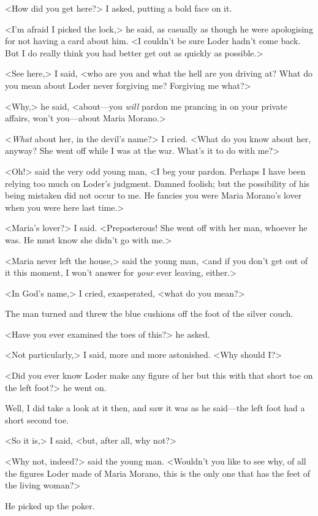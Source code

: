 <How did you get here?> I asked, putting a bold face on it.

<I'm afraid I picked the lock,> he said, as casually as though he were apologising for not having a card about him. <I couldn't be sure Loder hadn't come back. But I do really think you had better get out as quickly as possible.>

<See here,> I said, <who are you and what the hell are you driving at? What do you mean about Loder never forgiving me? Forgiving me what?>

<Why,> he said, <about—you \emph{will} pardon me prancing in on your private affairs, won't you—about Maria Morano.>

<\emph{What} about her, in the devil's name?> I cried. <What do you know about her, anyway? She went off while I was at the war. What's it to do with me?>

<Oh!> said the very odd young man, <I beg your pardon. Perhaps I have been relying too much on Loder's judgment. Damned foolish; but the possibility of his being mistaken did not occur to me. He fancies you were Maria Morano's lover when you were here last time.>

<Maria's lover?> I said. <Preposterous! She went off with her man, whoever he was. He must know she didn't go with me.>

<Maria never left the house,> said the young man, <and if you don't get out of it this moment, I won't answer for \emph{your} ever leaving, either.>

<In God's name,> I cried, exasperated, <what do you mean?>

The man turned and threw the blue cushions off the foot of the silver couch.

<Have you ever examined the toes of this?> he asked.

<Not particularly,> I said, more and more astonished. <Why should I\@?>

<Did you ever know Loder make any figure of her but this with that short toe on the left foot?> he went on.

Well, I did take a look at it then, and saw it was as he said—the left foot had a short second toe.

<So it is,> I said, <but, after all, why not?>

<Why not, indeed?> said the young man. <Wouldn't you like to see why, of all the figures Loder made of Maria Morano, this is the only one that has the feet of the living woman?>

He picked up the poker.

